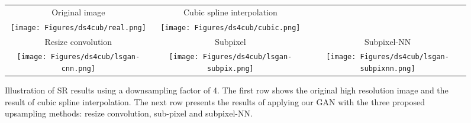 \documentclass{article}
\begin{document}


\begin{figure*}
\begin{tabular}{ccc}
Original image & Cubic spline interpolation \\
{\texttt{[image: Figures/ds4cub/real.png]}} &
{\texttt{[image: Figures/ds4cub/cubic.png]}} \\
Resize convolution & Subpixel & Subpixel-NN \\
{\texttt{[image: Figures/ds4cub/lsgan-cnn.png]}} &
{\texttt{[image: Figures/ds4cub/lsgan-subpix.png]}} &
{\texttt{[image: Figures/ds4cub/lsgan-subpixnn.png]}} \\
\end{tabular}
\centering
\caption{Illustration of SR results using a downsampling factor of 4. The first row shows the original high resolution image and the result of cubic spline interpolation. The next row presents the results of applying our GAN with the three proposed upsampling methods: resize convolution, sub-pixel and subpixel-NN.}
\label{fig:comparison-visual-1}
\centering
\end{figure*}
\end{document}
